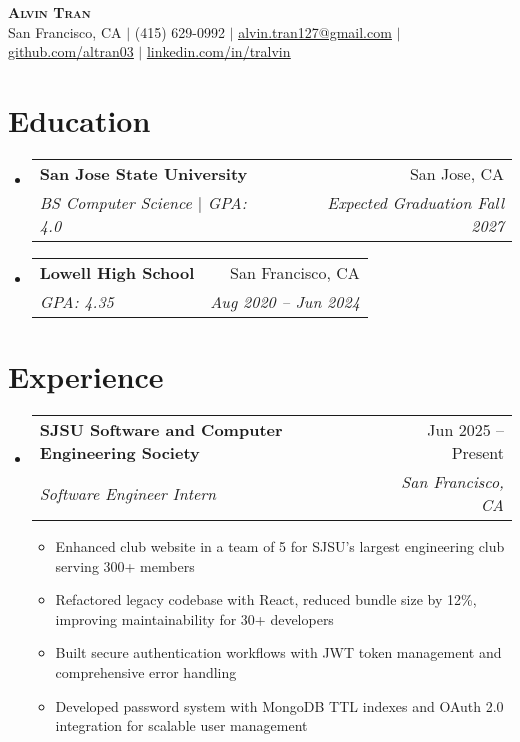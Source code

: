 \documentclass[letterpaper,11pt]{article}
\makeatletter
\newcommand{\resumeItem}[1]{
  \item\small{
    {#1 \vspace{-2pt}}
  }
}
\newcommand{\resumeSubheading}[4]{
  \vspace{-2pt}\item
    \begin{tabular*}{0.97\textwidth}[t]{l@{\extracolsep{\fill}}r}
      \textbf{#1} & #2 \\
      \textit{\small#3} & \textit{\small #4} \\
    \end{tabular*}\vspace{-7pt}
}
\newcommand{\resumeSubHeadingListStart}{\begin{itemize}[leftmargin=0.15in, label={}]}
\newcommand{\resumeSubHeadingListEnd}{\end{itemize}}
\newcommand{\resumeItemListStart}{\begin{itemize}}
\newcommand{\resumeItemListEnd}{\end{itemize}\vspace{-5pt}}
\makeatother
\begin{document}
\begin{center}
    \textbf{\Huge \scshape Alvin Tran} \\ \vspace{1pt}
    \small San Francisco, CA $|$ (415) 629-0992 $|$ \href{mailto:alvin.tran127@gmail.com}{\underline{alvin.tran127@gmail.com}} $|$ 
    \href{https://github.com/altran03}{\underline{github.com/altran03}} $|$
    \href{https://linkedin.com/in/tralvin}{\underline{linkedin.com/in/tralvin}}
\end{center}


\section{Education}
  \resumeSubHeadingListStart
    \resumeSubheading
      {San Jose State University}{San Jose, CA}
      {BS Computer Science $|$ GPA: 4.0}{Expected Graduation Fall 2027}
    \resumeSubheading
      {Lowell High School}{San Francisco, CA}
      {GPA: 4.35}{Aug 2020 -- Jun 2024}
  \resumeSubHeadingListEnd


\section{Experience}
  \resumeSubHeadingListStart

    \resumeSubheading
      {SJSU Software and Computer Engineering Society}{Jun 2025 -- Present}
      {Software Engineer Intern}{San Francisco, CA}
      \resumeItemListStart
        \resumeItem{Enhanced club website in a team of 5 for SJSU's largest engineering club serving 300+ members}
        \resumeItem{Refactored legacy codebase with React, reduced bundle size by 12\%, improving maintainability for 30+ developers}
        \resumeItem{Built secure authentication workflows with JWT token management and comprehensive error handling}
        \resumeItem{Developed password system with MongoDB TTL indexes and OAuth 2.0 integration for scalable user management}
      \resumeItemListEnd

  \resumeSubHeadingListEnd


\end{document}
